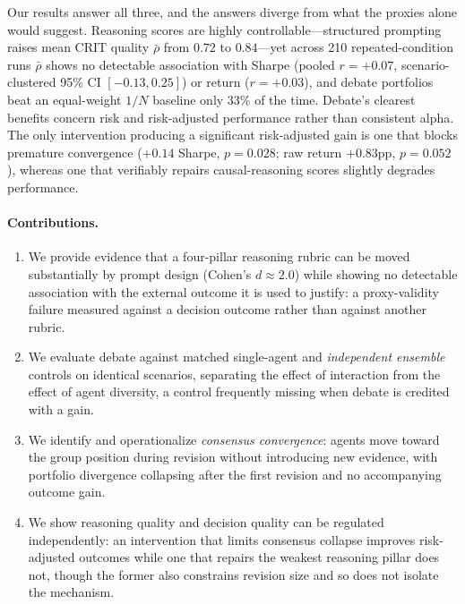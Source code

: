\documentclass{article}
\begin{document}
Our results answer all three, and the answers diverge from what the proxies alone
would suggest. Reasoning scores are highly controllable---structured prompting raises
mean CRIT quality $\bar{\rho}$ from $0.72$ to $0.84$---yet across 210 repeated-condition runs $\bar{\rho}$ shows no detectable association with Sharpe (pooled $r{=}{+}0.07$, scenario-clustered 95\% CI $[-0.13,0.25]$) or return ($r{=}{+}0.03$), and debate portfolios beat an equal-weight
$1/N$ baseline only 33\% of the time. Debate's clearest benefits concern risk and risk-adjusted performance rather than consistent alpha. The only intervention producing a significant risk-adjusted gain is one that blocks premature convergence ($+0.14$ Sharpe, $p{=}0.028$; raw return $+0.83$pp, $p{=}0.052$), whereas one that verifiably repairs causal-reasoning scores slightly degrades performance.

\vspace{-2pt}
\paragraph{Contributions.}
\vspace{-4pt}
\begin{enumerate}[label=(\arabic*),leftmargin=2.2em,itemsep=1pt,topsep=2pt]
    \item We provide evidence that a four-pillar reasoning rubric can be moved
    substantially by prompt design (Cohen's $d{\approx}2.0$) while showing no detectable
    association with the external outcome it is used to justify: a proxy-validity failure measured against a decision outcome rather than against another rubric.
    \item We evaluate debate against matched single-agent and \emph{independent
    ensemble} controls on identical scenarios, separating the effect of interaction
    from the effect of agent diversity, a control frequently missing when
    debate is credited with a gain.
    \item We identify and operationalize \emph{consensus convergence}: agents move
    toward the group position during revision without introducing new evidence, with
    portfolio divergence collapsing after the first revision and no accompanying
    outcome gain.
    \item We show reasoning quality and decision quality can be regulated independently: an intervention that limits consensus collapse improves risk-adjusted outcomes while one that repairs the weakest reasoning pillar does not, though the former also constrains revision size and so does not isolate the mechanism.
\end{enumerate}
\end{document}
